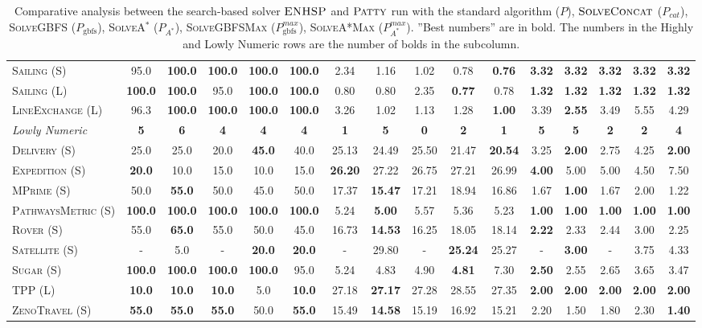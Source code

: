 \documentclass[11pt,landscape]{article}
\begin{document}
\begin{table*}[tb]
{\begin{tabular}{|l||ccccc||ccccc||ccccc||}
\textsc{Sailing} (S)&95.0&\textbf{100.0}&\textbf{100.0}&\textbf{100.0}&\textbf{100.0}&2.34&1.16&1.02&0.78&\textbf{0.76}&\textbf{3.32}&\textbf{3.32}&\textbf{3.32}&\textbf{3.32}&\textbf{3.32}\\
\textsc{Sailing} (L)&\textbf{100.0}&\textbf{100.0}&95.0&\textbf{100.0}&\textbf{100.0}&0.80&0.80&2.35&\textbf{0.77}&0.78&\textbf{1.32}&\textbf{1.32}&\textbf{1.32}&\textbf{1.32}&\textbf{1.32}\\
\textsc{LineExchange} (L)&96.3&\textbf{100.0}&\textbf{100.0}&\textbf{100.0}&\textbf{100.0}&3.26&1.02&1.13&1.28&\textbf{1.00}&3.39&\textbf{2.55}&3.49&5.55&4.29
\\\hline
\textit{Lowly Numeric}&\textbf{5}&\textbf{6}&\textbf{4}&\textbf{4}&\textbf{4}&\textbf{1}&\textbf{5}&\textbf{0}&\textbf{2}&\textbf{1}&\textbf{5}&\textbf{5}&\textbf{2}&\textbf{2}&\textbf{4}\\\hline
\textsc{Delivery} (S)&25.0&25.0&20.0&\textbf{45.0}&40.0&25.13&24.49&25.50&21.47&\textbf{20.54}&3.25&\textbf{2.00}&2.75&4.25&\textbf{2.00}\\
\textsc{Expedition} (S)&\textbf{20.0}&10.0&15.0&10.0&15.0&\textbf{26.20}&27.22&26.75&27.21&26.99&\textbf{4.00}&5.00&5.00&4.50&7.50\\
\textsc{MPrime} (S)&50.0&\textbf{55.0}&50.0&45.0&50.0&17.37&\textbf{15.47}&17.21&18.94&16.86&1.67&\textbf{1.00}&1.67&2.00&1.22\\
\textsc{PathwaysMetric} (S)&\textbf{100.0}&\textbf{100.0}&\textbf{100.0}&\textbf{100.0}&\textbf{100.0}&5.24&\textbf{5.00}&5.57&5.36&5.23&\textbf{1.00}&\textbf{1.00}&\textbf{1.00}&\textbf{1.00}&\textbf{1.00}\\
\textsc{Rover} (S)&55.0&\textbf{65.0}&55.0&50.0&45.0&16.73&\textbf{14.53}&16.25&18.05&18.14&\textbf{2.22}&2.33&2.44&3.00&2.25\\
\textsc{Satellite} (S)&-&5.0&-&\textbf{20.0}&\textbf{20.0}&-&29.80&-&\textbf{25.24}&25.27&-&\textbf{3.00}&-&3.75&4.33\\
\textsc{Sugar} (S)&\textbf{100.0}&\textbf{100.0}&\textbf{100.0}&\textbf{100.0}&95.0&5.24&4.83&4.90&\textbf{4.81}&7.30&\textbf{2.50}&2.55&2.65&3.65&3.47\\
\textsc{TPP} (L)&\textbf{10.0}&\textbf{10.0}&\textbf{10.0}&5.0&\textbf{10.0}&27.18&\textbf{27.17}&27.28&28.55&27.35&\textbf{2.00}&\textbf{2.00}&\textbf{2.00}&\textbf{2.00}&\textbf{2.00}\\
\textsc{ZenoTravel} (S)&\textbf{55.0}&\textbf{55.0}&\textbf{55.0}&50.0&\textbf{55.0}&15.49&\textbf{14.58}&15.19&16.92&15.21&2.20&1.50&1.80&2.30&\textbf{1.40}
\\\hline

        \end{tabular}}
        \caption{Comparative analysis between the search-based solver $\textsc{ENHSP}$ and  $\textsc{Patty}$ run with the standard algorithm ($P$),  $\textsc{SolveConcat}$ ($P_{cat}$), \textsc{SolveGBFS} ($P_\text{gbfs}$), \textsc{SolveA}$^*$ ($P_{A^*}$), \textsc{SolveGBFSMax} ($P_\text{gbfs}^{max}$), \textsc{SolveA*Max} ($P_{A^*}^{max}$). ''Best numbers'' are in bold.  The numbers in the Highly and Lowly Numeric rows are the number of bolds in the subcolumn.}
        \label{tab:experiments}
        \end{table*}
        
\end{document}
